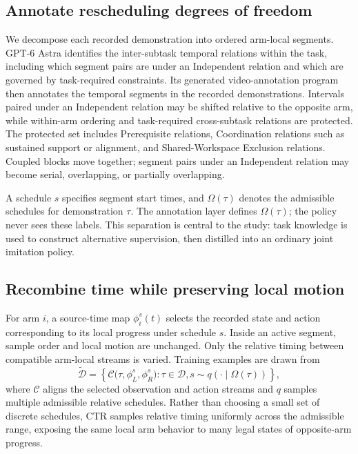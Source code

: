 \documentclass{article}
\newcommand{\method}{CTR}
\begin{document}
\subsection{Annotate rescheduling degrees of freedom}
We decompose each recorded demonstration into ordered arm-local segments. GPT-6 Astra identifies the inter-subtask temporal relations within the task, including which segment pairs are under an Independent relation and which are governed by task-required constraints. Its generated video-annotation program then annotates the temporal segments in the recorded demonstrations. Intervals paired under an Independent relation may be shifted relative to the opposite arm, while within-arm ordering and task-required cross-subtask relations are protected. The protected set includes Prerequisite relations, Coordination relations such as sustained support or alignment, and Shared-Workspace Exclusion relations. Coupled blocks move together; segment pairs under an Independent relation may become serial, overlapping, or partially overlapping.

A schedule $s$ specifies segment start times, and $\Omega(\tau)$ denotes the admissible schedules for demonstration $\tau$. The annotation layer defines $\Omega(\tau)$; the policy never sees these labels. This separation is central to the study: task knowledge is used to construct alternative supervision, then distilled into an ordinary joint imitation policy.

\subsection{Recombine time while preserving local motion}
For arm $i$, a source-time map $\phi_i^s(t)$ selects the recorded state and action corresponding to its local progress under schedule $s$. Inside an active segment, sample order and local motion are unchanged. Only the relative timing between compatible arm-local streams is varied. Training examples are drawn from
\begin{equation}
 \widetilde{\mathcal D}
 =\left\{\mathcal C\bigl(\tau,\phi_L^s,\phi_R^s\bigr):
 \tau\in\mathcal D,
 s\sim q(\cdot\mid\Omega(\tau))\right\},
 \label{eq:dataset}
\end{equation}
where $\mathcal C$ aligns the selected observation and action streams and $q$ samples multiple admissible relative schedules. Rather than choosing a small set of discrete schedules, \method{} samples relative timing uniformly across the admissible range, exposing the same local arm behavior to many legal states of opposite-arm progress.
\end{document}
